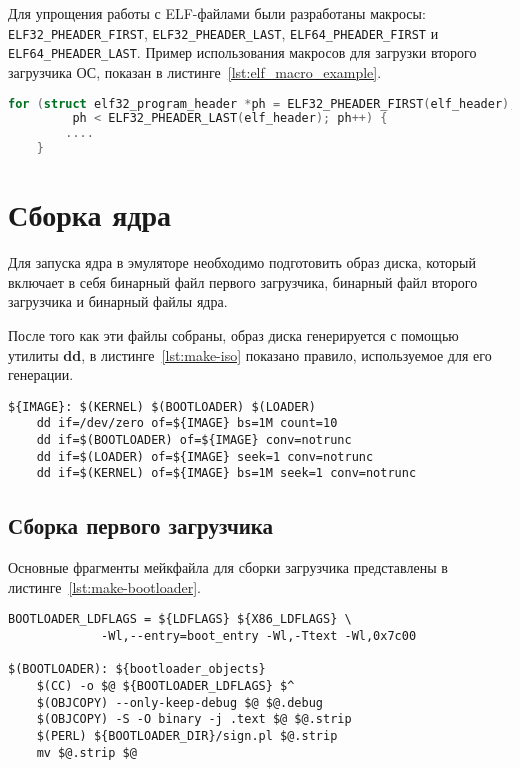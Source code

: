 Для упрощения работы с ELF-файлами были разработаны макросы: \texttt{ELF32\_PHEADER\_FIRST},
\texttt{ELF32\_PHEADER\_LAST}, \texttt{ELF64\_PHEADER\_FIRST} и \texttt{ELF64\_PHEADER\_LAST}.
Пример использования макросов для загрузки второго загрузчика ОС, показан в листинге~\ref{lst:elf_macro_example}.

\begin{lstlisting}[language=C,
caption={Пример использования макросов для работы с ELF-файлами},
label={lst:elf_macro_example}]
	for (struct elf32_program_header *ph = ELF32_PHEADER_FIRST(elf_header);
	     ph < ELF32_PHEADER_LAST(elf_header); ph++) {
		....
	}
\end{lstlisting}

\section{Сборка ядра}
Для запуска ядра в эмуляторе необходимо подготовить образ диска, который включает в себя
бинарный файл первого загрузчика, бинарный файл второго загрузчика и бинарный файлы ядра.

После того как эти файлы собраны, образ диска генерируется с помощью утилиты \textbf{dd},
в листинге~\ref{lst:make-iso} показано правило, используемое для его генерации.

\begin{lstlisting}[language=Make, caption={Правило для генерации образа диска}, label={lst:make-iso}]
${IMAGE}: $(KERNEL) $(BOOTLOADER) $(LOADER)
	dd if=/dev/zero of=${IMAGE} bs=1M count=10
	dd if=$(BOOTLOADER) of=${IMAGE} conv=notrunc
	dd if=$(LOADER) of=${IMAGE} seek=1 conv=notrunc
	dd if=$(KERNEL) of=${IMAGE} bs=1M seek=1 conv=notrunc
\end{lstlisting}

\subsection{Сборка первого загрузчика}
Основные фрагменты мейкфайла для сборки загрузчика представлены в листинге~\ref{lst:make-bootloader}.

\begin{lstlisting}[language=Make, caption={Фрагмент мейкфайла для сборки первого загрузчика}, label={lst:make-bootloader}]
BOOTLOADER_LDFLAGS = ${LDFLAGS} ${X86_LDFLAGS} \
		     -Wl,--entry=boot_entry -Wl,-Ttext -Wl,0x7c00

$(BOOTLOADER): ${bootloader_objects}
	$(CC) -o $@ ${BOOTLOADER_LDFLAGS} $^
	$(OBJCOPY) --only-keep-debug $@ $@.debug
	$(OBJCOPY) -S -O binary -j .text $@ $@.strip
	$(PERL) ${BOOTLOADER_DIR}/sign.pl $@.strip
	mv $@.strip $@
\end{lstlisting}

